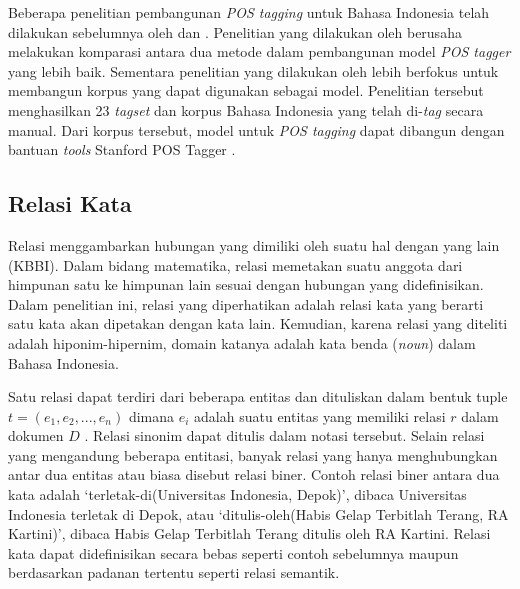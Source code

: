 Beberapa penelitian pembangunan \textit{POS tagging} untuk Bahasa Indonesia telah dilakukan sebelumnya oleh \cite{adriani2009statistical} dan \cite{dinakaramani2014designing}. Penelitian yang dilakukan oleh \cite{adriani2009statistical} berusaha melakukan komparasi antara dua metode dalam pembangunan model \textit{POS tagger} yang lebih baik. Sementara penelitian yang dilakukan oleh \cite{dinakaramani2014designing} lebih berfokus untuk membangun korpus yang dapat digunakan sebagai model. Penelitian tersebut menghasilkan 23 \textit{tagset} dan korpus Bahasa Indonesia yang telah di-\textit{tag} secara manual. Dari korpus tersebut, model untuk \textit{POS tagging} dapat dibangun dengan bantuan \textit{tools} Stanford POS Tagger \citep{toutanova2003feature}.

\subsection{Relasi Kata}
Relasi menggambarkan hubungan yang dimiliki oleh suatu hal dengan yang lain (KBBI). Dalam bidang matematika, relasi memetakan suatu anggota dari himpunan satu ke himpunan lain sesuai dengan hubungan yang didefinisikan. Dalam penelitian ini, relasi yang diperhatikan adalah relasi kata yang berarti satu kata akan dipetakan dengan kata lain. Kemudian, karena relasi yang diteliti adalah hiponim-hipernim, domain katanya adalah kata benda (\textit{noun}) dalam Bahasa Indonesia.

Satu relasi dapat terdiri dari beberapa entitas dan dituliskan dalam bentuk tuple $t = (e_1, e_2, ..., e_n)$ dimana $e_i$ adalah suatu entitas yang memiliki relasi $r$ dalam dokumen $D$ \citep{bach2007review}. Relasi sinonim dapat ditulis dalam notasi tersebut. Selain relasi yang mengandung beberapa entitasi, banyak relasi yang hanya menghubungkan antar dua entitas atau biasa disebut relasi biner. Contoh relasi biner antara dua kata adalah `terletak-di(Universitas Indonesia, Depok)', dibaca Universitas Indonesia terletak di Depok, atau `ditulis-oleh(Habis Gelap Terbitlah Terang, RA Kartini)', dibaca Habis Gelap Terbitlah Terang ditulis oleh RA Kartini. Relasi kata dapat didefinisikan secara bebas seperti contoh sebelumnya maupun berdasarkan padanan tertentu seperti relasi semantik.

